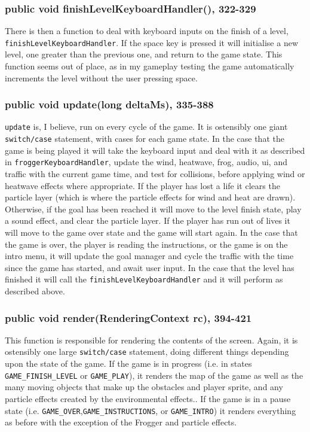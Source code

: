 \documentclass[12pt]{article}
\begin{document}
\subsubsection{public void finishLevelKeyboardHandler(), 322-329}
There is then a function to deal with keyboard inputs on the finish of a level, \verb|finishLevelKeyboardHandler|.
If the space key is pressed it will initialise a new level, one greater than the previous one, and return to the game state.
This function seems out of place, as in my gameplay testing the game automatically increments the level without the user pressing space.

\subsubsection{public void update(long deltaMs), 335-388}
\verb|update| is, I believe, run on every cycle of the game.
It is ostensibly one giant \verb|switch/case| statement, with cases for each game state.
In the case that the game is being played it will take the keyboard input and deal with it as described in \verb|froggerKeyboardHandler|, update the wind, heatwave, frog, audio, ui, and traffic with the current game time, and test for collisions, before applying wind or heatwave effects where appropriate.
If the player has lost a life it clears the particle layer (which is where the particle effects for wind and heat are drawn).
Otherwise, if the goal has been reached it will move to the level finish state, play a sound effect, and clear the particle layer.
If the player has run out of lives it will move to the game over state and the game will start again.
In the case that the game is over, the player is reading the instructions, or the game is on the intro menu, it will update the goal manager and cycle the traffic with the time since the game has started, and await user input.
In the case that the level has finished it will call the \verb|finishLevelKeyboardHandler| and it will perform as described above.

\subsubsection{public void render(RenderingContext rc), 394-421}
This function is responsible for rendering the contents of the screen.
Again, it is ostensibly one large \verb|switch/case| statement, doing different things depending upon the state of the game.
If the game is in progress (i.e. in states \verb|GAME_FINISH_LEVEL| or \verb|GAME_PLAY|), it renders the map of the game as well as the many moving objects that make up the obstacles and player sprite, and any particle effects created by the environmental effects..
If the game is in a pause state (i.e. \verb|GAME_OVER|,\verb|GAME_INSTRUCTIONS|, or \verb|GAME_INTRO|) it renders everything as before with the exception of the Frogger and particle effects.
\end{document}
